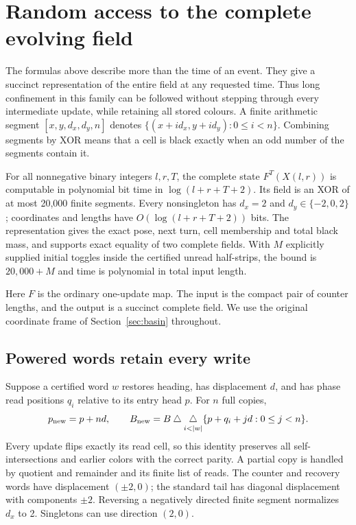 \section{Random access to the complete evolving field}\label{sec:access}
The formulas above describe more than the time of an event. They give a succinct
representation of the entire field at any requested time. Thus long confinement
in this family can be followed without stepping through every intermediate
update, while retaining all stored colours. A finite arithmetic
segment $[x,y,d_x,d_y,n]$ denotes
$\{(x+id_x,y+id_y):0\le i<n\}$. Combining segments by XOR means that a cell
is black exactly when an odd number of the segments contain it.

\begin{theorem}\label{thm:access}
For all nonnegative binary integers $l,r,T$, the complete state $F^T(X(l,r))$
is computable in polynomial bit time in $\log(l+r+T+2)$. Its field is an XOR
of at most 20,000 finite segments. Every nonsingleton has $d_x=2$ and
$d_y\in\{-2,0,2\}$; coordinates and lengths have $O(\log(l+r+T+2))$ bits.
The representation gives the exact pose, next turn, cell membership and total
black mass, and supports exact equality of two complete fields.
With $M$ explicitly supplied initial toggles inside the certified unread
half-strips, the bound is $20,000+M$ and time is polynomial in total input length.
\end{theorem}
Here $F$ is the ordinary one-update map. The input is the compact pair of counter
lengths, and the output is a succinct complete field. We use the original
coordinate frame of Section~\ref{sec:basin} throughout.

\subsection{Powered words retain every write}
Suppose a certified word $w$ restores heading, has displacement $d$, and has
phase read positions $q_i$ relative to its entry head $p$. For $n$ full copies,
\begin{equation}\label{eq:powered-field}
 p_{\rm new}=p+nd,\qquad
 B_{\rm new}=B\xor\mathop{\bigtriangleup}_{i<|w|}
           \{p+q_i+jd:0\le j<n\}.
\end{equation}
Every update flips exactly its read cell, so this identity preserves all
self-intersections and earlier colors with the correct parity. A partial copy
is handled by quotient and remainder and its finite list of reads. The counter
and recovery words have displacement $(\pm2,0)$; the standard tail has diagonal
displacement with components $\pm2$. Reversing a negatively directed finite
segment normalizes $d_x$ to 2. Singletons can use direction $(2,0)$.


